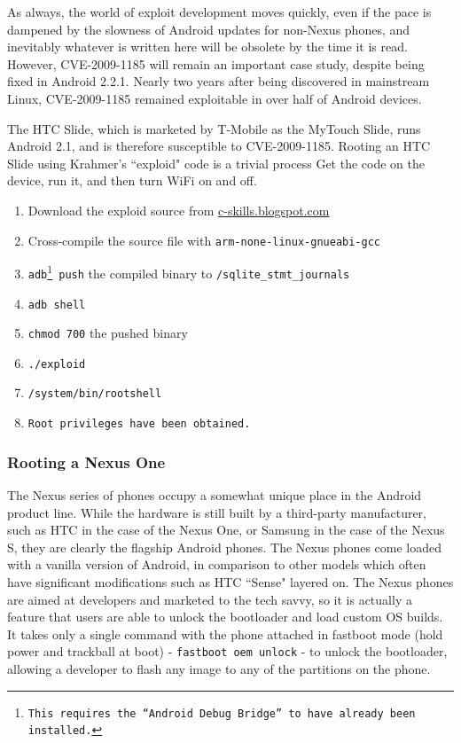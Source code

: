 As always, the world of exploit development moves quickly, even if the pace is dampened by the slowness of Android updates for non-Nexus phones, and inevitably whatever is written here will be obsolete by the time it is read. 
However, CVE-2009-1185 will remain an important case study, despite being fixed in Android 2.2.1.
Nearly two years after being discovered in mainstream Linux, CVE-2009-1185 remained exploitable in over half of Android devices.

The HTC Slide, which is marketed by T-Mobile as the MyTouch Slide, runs Android 2.1, and is therefore susceptible to CVE-2009-1185. 
Rooting an HTC Slide using Krahmer's ``exploid" code is a trivial process 
Get the code on the device, run it, and then turn WiFi on and off.

\begin{enumerate}
	\item Download the exploid source from \url{c-skills.blogspot.com}
	\item Cross-compile the source file with \texttt{arm-none-linux-gnueabi-gcc}
	\item \texttt{adb\footnote{This requires the ``Android Debug Bridge'' to have already been installed.} push} the compiled binary to \texttt{/sqlite\_stmt\_journals}
	\item \texttt{adb shell}
	\item \texttt{chmod 700} the pushed binary
	\item \texttt{./exploid}
	\item \texttt{/system/bin/rootshell}
	\item \texttt{Root privileges have been obtained.}
\end{enumerate}

\subsubsection{Rooting a Nexus One}

The Nexus series of phones occupy a somewhat unique place in the Android product line.  While the hardware is still built by a
third-party manufacturer, such as HTC in the case of the Nexus One, or Samsung in the case of the Nexus S, they are clearly the
flagship Android phones.  The Nexus phones come loaded with a vanilla version of Android, in comparison to other models which often
have significant modifications such as HTC ``Sense" layered on.  The Nexus phones are aimed at developers and marketed to the tech
savvy, so it is actually a feature that users are able to unlock the bootloader and load custom OS builds.  It takes only a single
command with the phone attached in fastboot mode (hold power and trackball at boot) - \texttt{fastboot oem unlock} - to unlock the
bootloader, allowing a developer to flash any image to any of the partitions on the phone.

